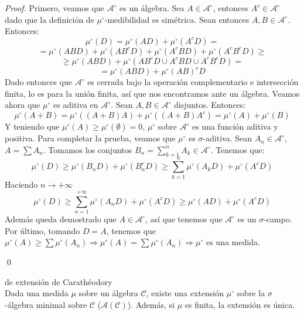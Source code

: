 \begin{proof}
Primero, veamos que $\mathcal{A}^\circ$ es un álgebra. Sea $A \in \mathcal{A}^\circ$, entonces $A^c \in \mathcal{A}^\circ$ dado que la definición de $\mu^\circ$-medibilidad es simétrica. Sean entonces $A,B \in \mathcal{A}^\circ$. Entonces:
$$ \mu^\circ(D) = \mu^\circ(AD) + \mu^\circ(A^cD) = $$
$$ = \mu^\circ(ABD) + \mu^\circ(AB^cD) + \mu^\circ(A^cBD) + \mu^\circ(A^cB^cD) \geq$$
$$ \geq \mu^\circ(ABD) + \mu^\circ (AB^cD \cup A^cBD \cup A^cB^cD) =$$
$$ = \mu^\circ(ABD) + \mu^\circ(AB)^cD$$
Dado entonces que $\mathcal{A}^\circ$ es cerrada bajo la operación complementario e intersección finita, lo es para la unión finita, así que nos encontramos ante un álgebra. Veamos ahora que $\mu^\circ$ es aditiva en $\mathcal{A}^\circ$. Sean $A,B \in \mathcal{A}^\circ$ disjuntos. Entonces:
$$\mu^\circ(A+B) = \mu^\circ((A+B)A) + \mu^\circ((A+B)A^c) = \mu^\circ(A) + \mu^\circ(B)$$
Y teniendo que $\mu^\circ(A) \geq \mu^\circ(\emptyset) = 0$, $\mu^\circ$ sobre $\mathcal{A}^\circ$ es una función aditiva y positiva. Para completar la prueba, veamos que $\mu^\circ$ es $\sigma$-aditiva. Sean $A_n \in \mathcal{A}^\circ$, $A = \displaystyle \sum A_n$. Tomamos los conjuntos $B_n = \displaystyle \sum_{k=1}^n A_k \in \mathcal{A}^\circ$. Tenemos que:
$$ \mu^\circ(D) \geq \mu^\circ (B_nD) + \mu^\circ (B_n^cD) \geq \sum_{k=1}^n\mu^\circ(A_kD) + \mu^\circ(A^cD) $$
Haciendo $n \to +\infty$
$$\mu^\circ(D) \geq \sum_{n=1}^{+\infty} \mu^\circ(A_nD) + \mu^\circ(A^cD) \geq \mu^\circ(AD) + \mu^\circ(A^cD)$$
Además queda demostrado que $A \in \mathcal{A}^\circ$, así que tenemos que $\mathcal{A}^\circ$ es un $\sigma$-campo.
Por último, tomando $D = A$, tenemos que $\mu^\circ(A) \geq \displaystyle \sum \mu^\circ(A_n) \Rightarrow \mu^\circ(A) = \sum \mu^\circ(A_n) \Rightarrow \mu^\circ$ es una medida.

\qed
\end{proof}

\begin{theorem}
de extensión de Carathéodory\\
Dada una medida $\mu$ sobre un álgebra $\mathcal{C}$, existe una extensión $\mu^\circ$ sobre la $\sigma$-álgebra minimal sobre $\mathcal{C}$ ($\mathcal{A}(\mathcal{C})$). Además, si $\mu$ es finita, la extensión es única.
\end{theorem}

